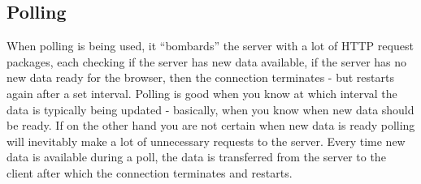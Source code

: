 \subsection{Polling}

When polling is being used, it ``bombards'' the server with a lot of 
HTTP request packages, each checking if the server has new data available, if 
the server has no new data ready for the browser, then the connection 
terminates - but restarts again after a set interval. 
Polling is good when you know at which interval the data is typically 
being updated - basically, when you know when new data should be ready. If on the other hand you are not certain 
when new data is ready polling will inevitably make a lot of unnecessary 
requests to the server. Every time new data is available 
during a poll, the data is transferred from the server to the client after 
which the connection terminates and restarts.\cite{lubbersgreco}